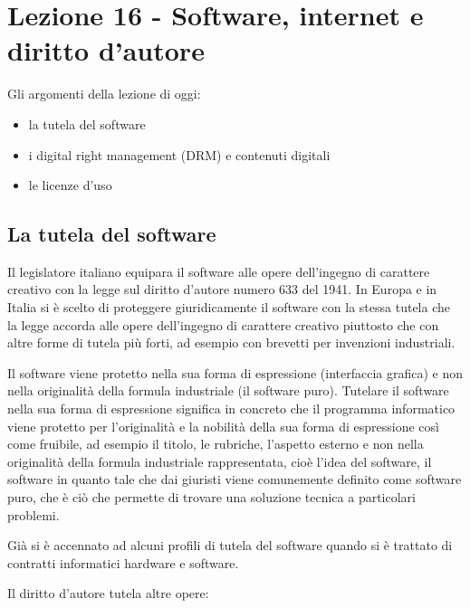 \chapter{Lezione 16 - Software, internet e diritto d'autore}

Gli argomenti della lezione di oggi:

\begin{itemize}
    \item la tutela del software
    \item i digital right management (DRM) e contenuti digitali
    \item le licenze d'uso
\end{itemize}


\section{La tutela del software}
Il legislatore italiano equipara il software alle opere dell'ingegno di carattere creativo con la legge sul diritto d'autore numero 633 del 1941. In Europa e in Italia si è scelto di proteggere giuridicamente il software con la stessa tutela che la legge accorda alle opere dell'ingegno di carattere creativo piuttosto che con altre forme di tutela più forti, ad esempio con brevetti per invenzioni industriali. 

Il software viene protetto nella sua forma di espressione (interfaccia grafica) e non nella originalità della formula industriale (il software puro). Tutelare il software nella sua forma di espressione significa in concreto che il programma informatico viene protetto per l'originalità e la nobilità della sua forma di espressione così come fruibile, ad esempio il titolo, le rubriche, l'aspetto esterno e non nella originalità della formula industriale rappresentata, cioè l'idea del software, il software in quanto tale che dai giuristi viene comunemente definito come software puro, che è ciò che permette di trovare una soluzione tecnica a particolari problemi. 

Già si è accennato ad alcuni profili di tutela del software quando si è trattato di contratti informatici hardware e software. 

Il diritto d'autore tutela altre opere:

